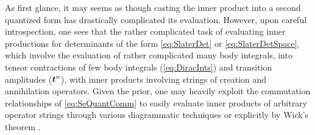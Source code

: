 As first glance, it may seems as though casting the inner product into a second quantized form has drastically complicated its evaluation.
However, upon careful introspection, one sees that the rather complicated task of evaluating inner productions for determinants 
of the form \cref{eq:SlaterDet} or \cref{eq:SlaterDetSpace}, which involve the evaluation of rather complicated many body integrals,
into tensor contractions of few body integrals (\cref{eq:DiracInts}) and transition amplitudes ($\boldsymbol{t}^n$),
with inner products involving strings of creation and annihilation operators. Given the prior, one may heavily exploit the
commutation relationships of \cref{eq:SeQuantComm} to easily evaluate inner products of arbitrary operator strings through
various diagrammatic techniques or explicitly by Wick's theorem \cite{Walecka12_book,Schuck04_book,Ohrn73_book} .

